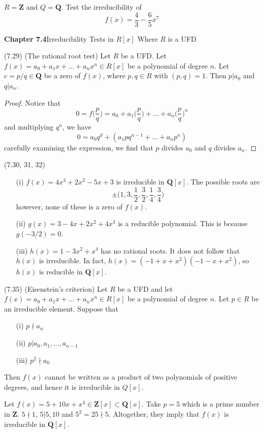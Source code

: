 \vspace{2ex}
\begin{ex}
$R={\bm Z}$ and $Q={\bm Q}$. Test the irreducibility of
\[f(x)=\dfrac{4}{3}-\dfrac{6}{5}x^{7}\]
\end{ex}
\vspace{2ex}
{\bf Chapter 7.4}\hspace{2ex}Irreducibility Tests in $R[x]$ Where $R$ is a UFD
\newline
\begin{prop}
(7.29) (The rational root test) Let $R$ be a UFD. Let $f(x)=a_0+a_1x+\ldots +a_{n}x^{n}\in R[x]$ be a polynomial of degree $n$. Let $c=p/q\in {\bm Q}$ be a zero of $f(x)$, where $p,q\in R$ with $(p,q)=1$. Then $p|a_0$ and $q|a_{n}$.  
\end{prop}
\vspace{2ex}
\begin{proof}
Notice that
\[0=f\Big(\dfrac{p}{q}\Big)=a_0+a_1\Big(\dfrac{p}{q}\Big)+\ldots +a_{n}\Big(\dfrac{p}{q}\Big)^{n}\]
and multiplying $q^{n}$, we have
\[0=a_0q^{d}+(a_1pq^{n-1}+\ldots +a_{n}p^{n})\]
carefully examining the expression, we find that $p$ divides $a_0$ and $q$ divides $a_{n}$.
\end{proof}
\vspace{2ex}
\begin{ex}
(7.30, 31, 32) 
\begin{itemize}
\item[(i)] $f(x)=4x^3+2x^2-5x+3$ is irreducible in ${\bm Q}[x]$. The possible roots are
\[\pm \Big(1,3,\dfrac{1}{2},\dfrac{3}{2},\dfrac{1}{4},\dfrac{3}{4}\Big)\]
however, none of these is a zero of $f(x)$. 
\item[(ii)] $g(x)=3-4x+2x^2+4x^3$ is a reducible polynomial. This is bceause $g(-3/2)=0$. 
\item[(iii)] $h(x)=1-3x^2+x^{4}$ has no rational roots. It does not follow that $h(x)$ is irreducible. In fact, $h(x)=(-1+x+x^2)(-1-x+x^2)$, so $h(x)$ is reducible in ${\bm Q}[x]$.  
\end{itemize}
\end{ex}
\vspace{2ex}
\begin{thm}
(7.35) (Eisenstein's criterion) Let $R$ be a UFD and let $f(x)=a_0+a_1x+\ldots +a_{n}x^{n}\in R[x]$ be a polynomial of degree $n$. Let $p\in R$ be an irreducible element. Suppose that
\begin{itemize}
\item[(i)] $p\nmid a_{n}$
\item[(ii)] $p|a_0,a_1,\ldots ,a_{n-1}$
\item[(iii)] $p^2\nmid a_0$
\end{itemize}
Then $f(x)$ cannot be written as a product of two polynomials of positive degrees, and hence it is irreducible in $Q[x]$.
\end{thm}
\vspace{2ex}
\begin{ex}
Let $f(x)=5+10x+x^{4}\in {\bm Z}[x]\subset {\bm Q}[x]$. Take $p=5$ which is a prime number in ${\bm Z}$. $5\nmid 1$, $5|5,10$ and $5^2=25\nmid 5$. Altogether, they imply that $f(x)$ is irreducible in ${\bm Q}[x]$.   
\end{ex}
\vspace{2ex}

